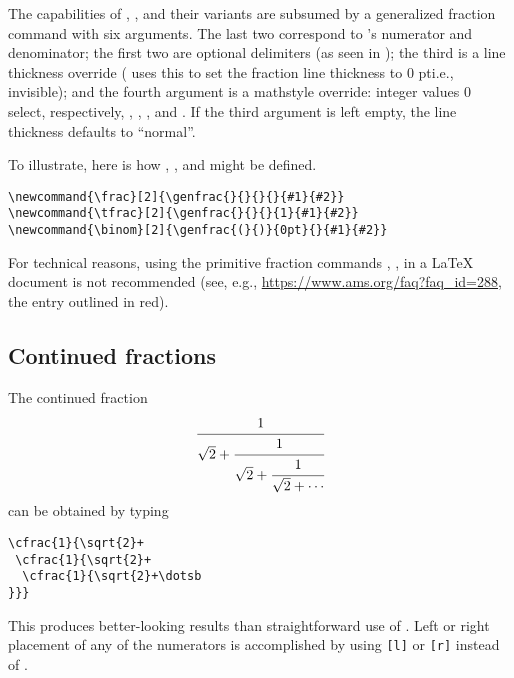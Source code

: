The capabilities of , , and their variants are
subsumed by a generalized fraction command  with six
arguments. The last two correspond to 's numerator and
denominator; the first two are optional delimiters (as seen in
); the third is a line thickness override ( uses
this to set the fraction line thickness to 0 pt\mdash i.e., invisible);
and the fourth argument is a mathstyle override: integer values
0 select, respectively, , ,
, and . If the third argument is
left empty, the line thickness defaults to ``normal''.

\begin{cmdspec}[25em]
\string\genfrac {}  
  
\end{cmdspec}
To illustrate, here is how , , and
 might be defined.
\begin{verbatim}
\newcommand{\frac}[2]{\genfrac{}{}{}{}{#1}{#2}}
\newcommand{\tfrac}[2]{\genfrac{}{}{}{1}{#1}{#2}}
\newcommand{\binom}[2]{\genfrac{(}{)}{0pt}{}{#1}{#2}}
\end{verbatim}

\begin{notes}
  \singlenote For technical reasons, using the primitive fraction
  commands , ,  in a \LaTeX{} document is
  not recommended (see, e.g., \url{https://www.ams.org/faq?faq\_id=288},
  the entry outlined in red).
\end{notes}

\subsection{Continued fractions}

The continued fraction
\begin{equation}
\cfrac{1}{\sqrt{2}+
 \cfrac{1}{\sqrt{2}+
  \cfrac{1}{\sqrt{2}+\cdots
}}}
\end{equation}
can be obtained by typing
{\samepage
\begin{verbatim}
\cfrac{1}{\sqrt{2}+
 \cfrac{1}{\sqrt{2}+
  \cfrac{1}{\sqrt{2}+\dotsb
}}}
\end{verbatim}
}%
This produces better-looking results than straightforward use of
. Left or right placement of any of the numerators is
accomplished by using \verb|[l]| or \verb|[r]| instead of
.

